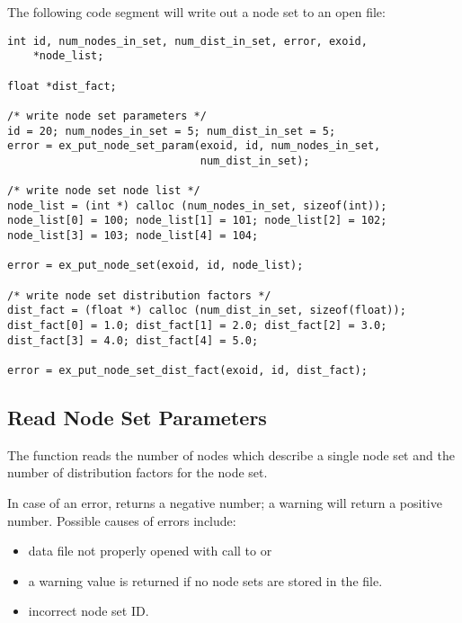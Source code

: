 The following code segment will write out a node set to an open \exo{}
file:

\begin{lstlisting}
int id, num_nodes_in_set, num_dist_in_set, error, exoid,
    *node_list;

float *dist_fact;

/* write node set parameters */
id = 20; num_nodes_in_set = 5; num_dist_in_set = 5;
error = ex_put_node_set_param(exoid, id, num_nodes_in_set,
                              num_dist_in_set);

/* write node set node list */
node_list = (int *) calloc (num_nodes_in_set, sizeof(int));
node_list[0] = 100; node_list[1] = 101; node_list[2] = 102;
node_list[3] = 103; node_list[4] = 104;

error = ex_put_node_set(exoid, id, node_list);

/* write node set distribution factors */
dist_fact = (float *) calloc (num_dist_in_set, sizeof(float));
dist_fact[0] = 1.0; dist_fact[1] = 2.0; dist_fact[2] = 3.0;
dist_fact[3] = 4.0; dist_fact[4] = 5.0;

error = ex_put_node_set_dist_fact(exoid, id, dist_fact);
\end{lstlisting}

\subsection{Read Node Set Parameters}

The function  reads the number of
nodes which describe a single node set and the number of distribution
factors for the node set.

In case of an error,  returns a
negative number; a warning will return a positive number. Possible
causes of errors include:

\begin{itemize}
 \item data file not properly opened with call to 
 or 

 \item a warning value is returned if no node sets are stored
in the file.

 \item incorrect node set ID.
\end{itemize}


